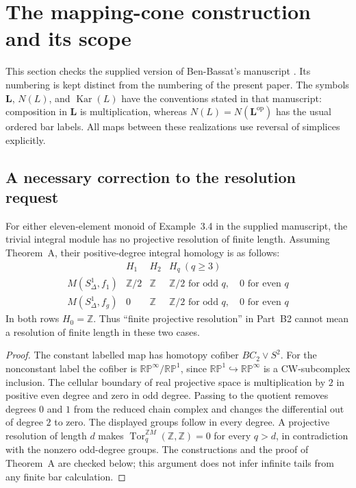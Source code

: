 \section{The mapping-cone construction and its scope}\label{sec:B}
This section checks the supplied version of Ben-Bassat's manuscript
\cite{BenBassat2026B}.  Its
numbering is kept distinct from the numbering of the present paper.  The
symbols $\mathbf L$, $N(L)$, and $\operatorname{Kar}(L)$ have the conventions
stated in that manuscript: composition in $\mathbf L$ is multiplication,
whereas $N(L)=N(\mathbf L^{\mathrm{op}})$ has the usual ordered bar labels.
All maps between these realizations use reversal of simplices explicitly.

\subsection{A necessary correction to the resolution request}
\begin{proposition}\label{prop:B-finite-resolution-obstruction}
For either eleven-element monoid of Example~3.4 in the supplied manuscript,
the trivial integral module has no projective resolution of finite length.
Assuming Theorem~A, their positive-degree integral homology is as follows:
\[
\begin{array}{c|ccc}
 &H_1&H_2&H_q\ (q\ge3)\\ \hline
 M(S^1_\Delta,f_1)&\mathbb Z/2&\mathbb Z&
 \mathbb Z/2\text{ for odd }q,\quad0\text{ for even }q\\
 M(S^1_\Delta,f_g)&0&\mathbb Z&
 \mathbb Z/2\text{ for odd }q,\quad0\text{ for even }q
\end{array}
\]
In both rows $H_0=\mathbb Z$.  Thus ``finite projective resolution'' in
Part~B2 cannot mean a resolution of finite length in these two cases.
\end{proposition}
\begin{proof}
The constant labelled map has homotopy cofiber $BC_2\vee S^2$.
For the nonconstant label the cofiber is $\mathbb{RP}^{\infty}/
\mathbb{RP}^{1}$, since $\mathbb{RP}^{1}\hookrightarrow
\mathbb{RP}^{\infty}$ is a CW-subcomplex inclusion.  The cellular boundary
of real projective space is multiplication by $2$ in positive even degree
and zero in odd degree.  Passing to the quotient removes degrees $0$ and
$1$ from the reduced chain complex and changes the differential out of
degree $2$ to zero.  The displayed groups follow in every degree.  A
projective resolution of length $d$ makes
$\operatorname{Tor}^{\mathbb ZM}_q(\mathbb Z,\mathbb Z)=0$ for every $q>d$,
in contradiction with the nonzero odd-degree groups.  The constructions
and the proof of Theorem~A are checked below; this argument does not infer
infinite tails from any finite bar calculation.
\end{proof}

